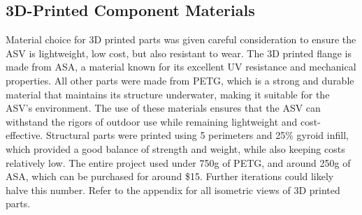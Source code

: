 \subsection{3D-Printed Component Materials}
Material choice for 3D printed parts was given careful consideration to ensure the ASV is lightweight, low cost, but also resistant to wear. The 3D printed flange is made from ASA, a material known for its excellent UV resistance and mechanical properties. All other parts were made from PETG, which is a strong and durable material that maintains its structure underwater, making it suitable for the ASV's environment. The use of these materials ensures that the ASV can withstand the rigors of outdoor use while remaining lightweight and cost-effective. Structural parts were printed using 5 perimeters and 25\% gyroid infill, which provided a good balance of strength and weight, while also keeping costs relatively low. The entire project used under 750g of PETG, and around 250g of ASA, which can be purchased for around \$15. Further iterations could likely halve this number. Refer to the appendix for all isometric views of 3D printed parts.